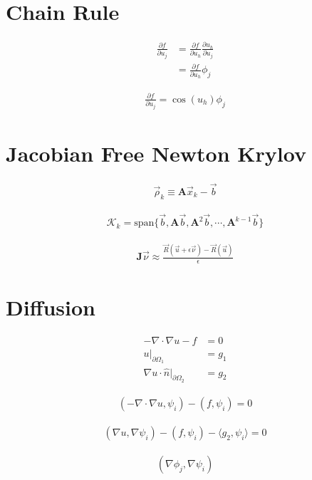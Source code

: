 \documentclass{article}
\begin{document}
	\section*{Chain Rule}
	
	\begin{align*}
		\frac{\partial f}{\partial u_j} &= \frac{\partial f}{\partial u_h} \frac{\partial u_h}{\partial u_j} \\
										&= \frac{\partial f}{\partial u_h} \phi_j
	\end{align*}
	
	\begin{align*}
		\frac{\partial f}{\partial u_j} = \cos (u_h) \phi_j
	\end{align*}
	
	\section*{Jacobian Free Newton Krylov}
	
	\begin{align*}
		\vec{\rho}_k \equiv \mathbf{A} \vec{x}_k - \vec{b}
	\end{align*}
	
	\begin{align*}
		\mathcal{K}_k = \text{span}\{\vec{b}, \mathbf{A} \vec{b}, \mathbf{A}^2 \vec{b}, \cdots, \mathbf{A}^{k-1} \vec{b}\}
	\end{align*}
	
	\begin{align*}
		\mathbf{J} \vec{\nu} \approx \frac{\vec{R}(\vec{u} + \epsilon \vec{\nu}) - \vec{R}(\vec{u})}{\epsilon}
	\end{align*}
	
	\section*{Diffusion}
	
	\begin{align*}
		-\nabla \cdot \nabla u - f &= 0 \\
		u|_{\partial \Omega_1} &= g_1 \\
		\nabla u \cdot \hat{n}|_{\partial \Omega_2} &= g_2
	\end{align*}
	
	\begin{align*}
		(-\nabla \cdot \nabla u, \psi_i) - (f, \psi_i) = 0
	\end{align*}
	
	\begin{align*}
		(\nabla u, \nabla \psi_i) - (f, \psi_i) - \langle g_2, \psi_i \rangle = 0
	\end{align*}
	
	\begin{align*}
		(\nabla \phi_j, \nabla \psi_i)
	\end{align*}
\end{document}
